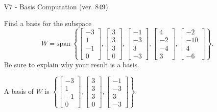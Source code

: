 \begin{exercise}
  \begin{exerciseTitle}V7 - Basis Computation (ver. 849)\end{exerciseTitle}
  \begin{exerciseStatement}
    Find a basis for the subspace 
\[W=\mathrm{span}\ \left\{\left[\begin{array}{r}
-3 \\
1 \\
-1 \\
0
\end{array}\right] , \left[\begin{array}{r}
3 \\
3 \\
3 \\
0
\end{array}\right] , \left[\begin{array}{r}
-1 \\
-3 \\
3 \\
-3
\end{array}\right] , \left[\begin{array}{r}
4 \\
-2 \\
-4 \\
3
\end{array}\right] , \left[\begin{array}{r}
-2 \\
-10 \\
4 \\
-6
\end{array}\right]\right\}.\]
 Be sure to explain why your result is a basis.


  \end{exerciseStatement}
  \begin{exerciseAnswer}
   A basis of \(W\) is  \(\left\{\left[\begin{array}{r}
-3 \\
1 \\
-1 \\
0
\end{array}\right] , \left[\begin{array}{r}
3 \\
3 \\
3 \\
0
\end{array}\right] , \left[\begin{array}{r}
-1 \\
-3 \\
3 \\
-3
\end{array}\right]\right\}\).
  


  \end{exerciseAnswer}
\end{exercise}